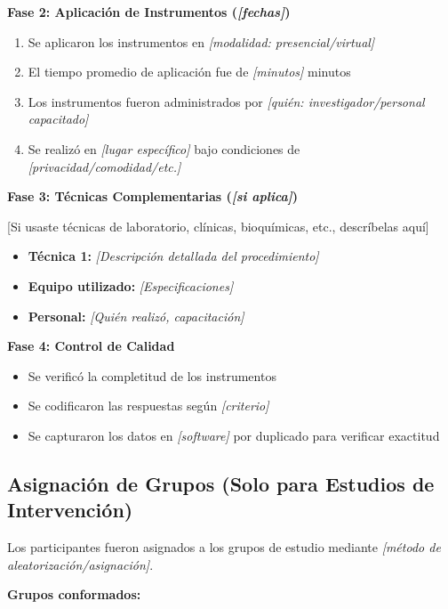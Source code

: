 \textbf{Fase 2: Aplicación de Instrumentos (\textit{[fechas]})}

\begin{enumerate}
    \item Se aplicaron los instrumentos en \textit{[modalidad: presencial/virtual]}
    \item El tiempo promedio de aplicación fue de \textit{[minutos]} minutos
    \item Los instrumentos fueron administrados por \textit{[quién: investigador/personal capacitado]}
    \item Se realizó en \textit{[lugar específico]} bajo condiciones de \textit{[privacidad/comodidad/etc.]}
\end{enumerate}

\textbf{Fase 3: Técnicas Complementarias (\textit{[si aplica]})}

[Si usaste técnicas de laboratorio, clínicas, bioquímicas, etc., descríbelas aquí]

\begin{itemize}
    \item \textbf{Técnica 1:} \textit{[Descripción detallada del procedimiento]}
    \item \textbf{Equipo utilizado:} \textit{[Especificaciones]}
    \item \textbf{Personal:} \textit{[Quién realizó, capacitación]}
\end{itemize}

\textbf{Fase 4: Control de Calidad}

\begin{itemize}
    \item Se verificó la completitud de los instrumentos
    \item Se codificaron las respuestas según \textit{[criterio]}
    \item Se capturaron los datos en \textit{[software]} por duplicado para verificar exactitud
\end{itemize}

\subsection{Asignación de Grupos (Solo para Estudios de Intervención)}
\label{subsec:asignacion_grupos}


Los participantes fueron asignados a los grupos de estudio mediante \textit{[método de aleatorización/asignación]}.

\textbf{Grupos conformados:}

